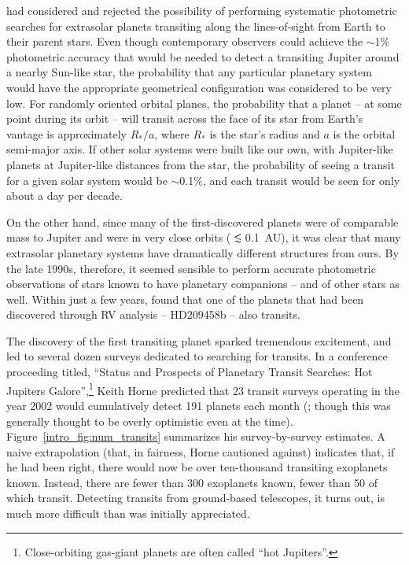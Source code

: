 \citet{huang1959} had considered and rejected the possibility of
performing systematic photometric searches for extrasolar planets
transiting along the lines-of-sight from Earth to their parent stars.
Even though contemporary observers could achieve the $\sim$1\%
photometric accuracy that would be needed to detect a transiting
Jupiter around a nearby Sun-like star, the probability that any
particular planetary system would have the appropriate geometrical
configuration was considered to be very low.  For randomly oriented
orbital planes, the probability that a planet -- at some point during
its orbit -- will transit across the face of its star from Earth's
vantage is approximately $R_*/a$, where $R_*$ is the star's radius and
$a$ is the orbital semi-major axis.  If other solar systems were built
like our own, with Jupiter-like planets at Jupiter-like distances from
the star, the probability of seeing a transit for a given solar system
would be $\sim$0.1\%, and each transit would be seen for only about a
day per decade.

On the other hand, since many of the first-discovered planets were of
comparable mass to Jupiter and were in very close orbits
($\lsim$0.1~AU), it was clear that many extrasolar planetary systems
have dramatically different structures from ours.  By the late 1990s,
therefore, it seemed sensible to perform accurate photometric
observations of stars known to have planetary companions -- and of
other stars as well.  Within just a few years, \citet{henry_et_al2000}
found that one of the planets that had been discovered through RV
analysis -- HD209458b -- also transits.

The discovery of the first transiting planet sparked tremendous
excitement, and led to several dozen surveys dedicated to searching
for transits.  In a conference proceeding titled, ``Status and
Prospects of Planetary Transit Searches: Hot Jupiters
Galore'',\footnote{Close-orbiting gas-giant planets are often called
``hot Jupiters''.}
%
Keith Horne predicted that 23 transit surveys operating in the year
2002 would cumulatively detect 191 planets each month
(\citealt{horne2003}; though this was generally thought to be overly
optimistic even at the time).  Figure~\ref{intro_fig:num_transits}
summarizes his survey-by-survey estimates.  A naive extrapolation
(that, in fairness, Horne cautioned against) indicates that, if he had
been right, there would now be over ten-thousand transiting exoplanets
known.  Instead, there are fewer than 300 exoplanets known, fewer than
50 of which transit.  Detecting transits from ground-based telescopes,
it turns out, is much more difficult than was initially appreciated.

